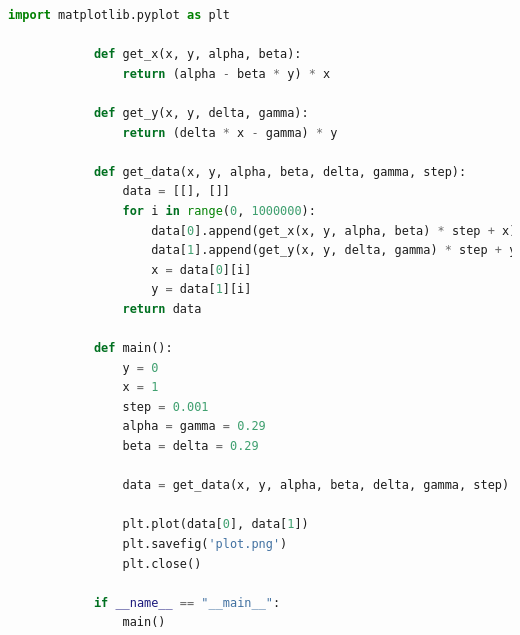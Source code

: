 \documentclass[14pt, a4paper]{extarticle}
\begin{document}
		\begin{lstlisting}[language=Python, frame=single, gobble=5, tabsize=2]
			import matplotlib.pyplot as plt
			
			def get_x(x, y, alpha, beta):
				return (alpha - beta * y) * x
			
			def get_y(x, y, delta, gamma):
				return (delta * x - gamma) * y
			
			def get_data(x, y, alpha, beta, delta, gamma, step):
				data = [[], []]
				for i in range(0, 1000000):
					data[0].append(get_x(x, y, alpha, beta) * step + x)
					data[1].append(get_y(x, y, delta, gamma) * step + y)
					x = data[0][i]
					y = data[1][i]
				return data
			
			def main():
				y = 0
				x = 1
				step = 0.001
				alpha = gamma = 0.29
				beta = delta = 0.29
			
				data = get_data(x, y, alpha, beta, delta, gamma, step)
			
				plt.plot(data[0], data[1])
				plt.savefig('plot.png')
				plt.close()
			
			if __name__ == "__main__":
				main()
			
		\end{lstlisting}
		
\end{document}
